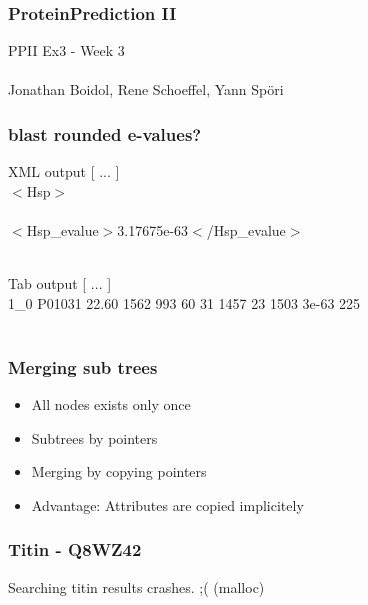 \documentclass{beamer}
\begin{document}
\begin{frame}
 \frametitle{ProteinPrediction II}
 PPII Ex3 - Week 3\\
 \hfill \\
 Jonathan Boidol, Rene Schoeffel, Yann Sp\"ori
\end{frame}

\begin{frame}[fragile]
  \frametitle{blast rounded e-values?}
\begin{block}{XML output}
[ ... ]\\
$<$Hsp$>$\\
  [ ... ]\\
  $<$Hsp\_evalue$>$3.17675e-63$<$/Hsp\_evalue$>$\\
[ ... ]\\
     \end{block}
     \begin{block}{Tab output}
[ ... ]\\
1\_0	P01031	22.60	1562	993	60	31	1457	23	1503	3e-63	225\\
[ ... ]\\
     \end{block}
\end{frame}

\begin{frame}
 \frametitle{Merging sub trees}
 \begin{itemize}
  \item All nodes exists only once
  \item Subtrees by pointers
  \item Merging by copying pointers
  \item Advantage: Attributes are copied implicitely
 \end{itemize}

\end{frame}

\begin{frame}
 \frametitle{Titin - Q8WZ42}
 Searching titin results crashes. ;( (malloc)
\end{frame}
\end{document}
